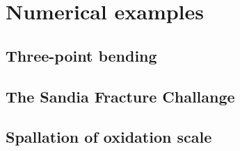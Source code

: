 \section{Numerical examples}
\label{section: ductile/examples}

\subsection{Three-point bending}

\subsection{The Sandia Fracture Challange}

\subsection{Spallation of oxidation scale}
